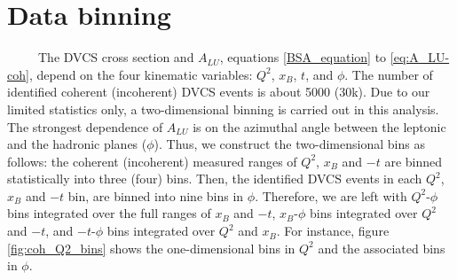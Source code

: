 \section{Data binning}
~~~~~The DVCS cross section and $A_{LU}$, equations \ref{BSA_equation} to 
\ref{eq:A_LU-coh}, depend on the four kinematic variables: $Q^{2}$, $x_{B}$, 
$t$, and $\phi$. The number of identified coherent (incoherent) DVCS events is 
about 5000 (30k). Due to our limited statistics only, a two-dimensional binning 
is carried out in this analysis.  The strongest dependence of $A_{LU}$ is on 
the azimuthal angle between the leptonic and the hadronic planes ($\phi$).  
Thus, we construct the two-dimensional bins as follows: the coherent 
(incoherent) measured ranges of $Q^{2}$, $x_{B}$ and $-t$ are binned 
statistically into three (four) bins.  Then, the identified DVCS events in each 
$Q^{2}$, $x_{B}$ and $-t$ bin, are binned into nine bins in $\phi$.  Therefore, 
we are left with $Q^2$-$\phi$ bins integrated over the full ranges of $x_{B}$ 
and $-t$, $x_{B}$-$\phi$ bins integrated over $Q^2$ and $-t$, and $-t$-$\phi$ 
bins integrated over $Q^2$ and $x_{B}$. For instance, figure 
\ref{fig:coh_Q2_bins} shows the one-dimensional bins in $Q^2$ and the 
associated bins in $\phi$.

